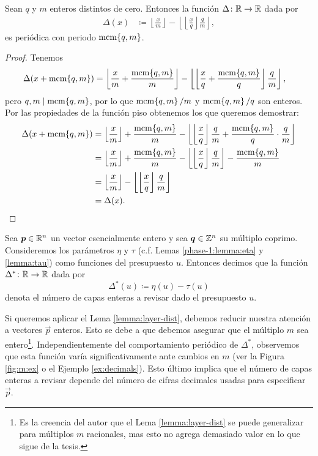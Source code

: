 \begin{lemma}
	\label{lemma:layer-dist}
	Sean $q$ y $m$ enteros distintos de cero. Entonces la función $\Delta \colon \mathbb{R} \to \mathbb{R}$ dada por
	\begin{align*}
		\Delta(x) &\coloneq \left\lfloor \frac{x}{m} \right\rfloor - \left\lfloor \left\lfloor
		\frac{x}{q} \right\rfloor \frac{q}{m} \right\rfloor,
	\end{align*}
	es periódica con periodo $\mathop{\mathrm{mcm}{\left\lbrace q, m \right\rbrace}}$.
\end{lemma}
\begin{proof}
	Tenemos
	\begin{align*}
		\Delta(x + \mathop{\mathrm{mcm}{\left\lbrace q, m \right\rbrace}})
		&= \left\lfloor \frac{x}{m} + \frac{\mathop{\mathrm{mcm}{\left\lbrace q, m \right\rbrace}}}{m} \right\rfloor
		- \left\lfloor \left\lfloor \frac{x}{q} + \frac{\mathop{\mathrm{mcm}{\left\lbrace q,m \right\rbrace}}}{q} \right\rfloor \frac{q}{m}
			\right\rfloor,
	\end{align*}
	pero $q, m \mid \mathop{\mathrm{mcm}{\left\lbrace q, m \right\rbrace}}$, por lo que $\mathop{\mathrm{mcm}{\left\lbrace q,m \right\rbrace}}/m$ y $\mathop{\mathrm{mcm}{\left\lbrace q,m \right\rbrace}}/q$ son enteros. Por las
	propiedades de la función piso obtenemos los que queremos demostrar:
	\begin{align*}
		\Delta(x + \mathop{\mathrm{mcm}{\left\lbrace q,m \right\rbrace}})
		&=
		\left\lfloor \frac{x}{m} \right\rfloor + \frac{\mathop{\mathrm{mcm}{\left\lbrace q,m \right\rbrace}}}{m}
		- \left\lfloor \left\lfloor \frac{x}{q} \right\rfloor\frac{q}{m} + 
			\frac{\mathop{\mathrm{mcm}{\left\lbrace q,m \right\rbrace}}}{q}\cdot\frac{q}{m} \right\rfloor \\
		&= 
		\left\lfloor \frac{x}{m} \right\rfloor + \frac{\mathop{\mathrm{mcm}{\left\lbrace q,m \right\rbrace}}}{m}
		- \left\lfloor \left\lfloor \frac{x}{q} \right\rfloor\frac{q}{m}\right\rfloor
		- \frac{\mathop{\mathrm{mcm}{\left\lbrace q,m \right\rbrace}}}{m} \\
		&= 
		\left\lfloor \frac{x}{m} \right\rfloor
		- \left\lfloor \left\lfloor \frac{x}{q} \right\rfloor\frac{q}{m}\right\rfloor \\
		&= \Delta(x).
	\end{align*}
\end{proof}
\begin{definition}
	Sea $\boldsymbol{p} \in \mathbb{R}^n$ un vector esencialmente entero y sea $\boldsymbol{q} \in \mathbb{Z}^n$ su múltiplo
	coprimo. Consideremos los parámetros $\eta$ y $\tau$ (c.f. Lemas \ref{phase-1:lemma:eta} y
	\ref{lemma:tau}) como funciones del presupuesto $u$. Entonces decimos que la función $\Delta^*
	\colon \mathbb{R} \to \mathbb{R}$ dada por
	\begin{equation}
		\label{eq:dist-layers}
		\Delta^*(u) \coloneq \eta(u) - \tau(u)
	\end{equation}
	denota el número de capas enteras a revisar dado el presupuesto $u$.
\end{definition}

Si queremos aplicar el Lema \ref{lemma:layer-dist}, debemos reducir nuestra atención a vectores
$\vec{p}$ enteros. Esto se debe a que debemos asegurar que el múltiplo $m$ sea entero\footnote{
	Es la creencia del autor que el Lema \ref{lemma:layer-dist} se puede generalizar para múltiplos
	$m$ racionales, mas esto no agrega demasiado valor en lo que sigue de la tesis.
}. Independientemente del comportamiento
periódico de $\Delta^*$, observemos que esta función varía significativamente ante cambios en $m$
(ver la Figura \ref{fig:m:ex} o el Ejemplo \ref{ex:decimals}). Esto último implica que el número de
capas enteras a revisar depende del número de cifras decimales usadas para especificar $\vec{p}$.

